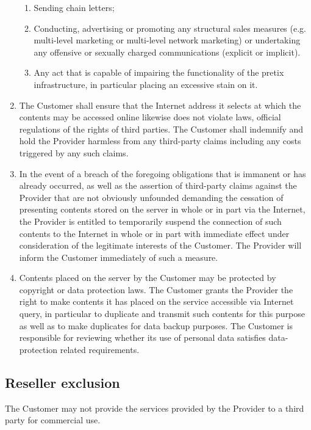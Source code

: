 \documentclass{terms}
\begin{document}
\begin{enumerate}
\begin{enumerate}
\item Sending chain letters;
\item Conducting, advertising or promoting any structural sales measures (e.g. multi-level marketing or multi-level network marketing) or undertaking any offensive or sexually charged communications (explicit or implicit).
\item Any act that is capable of impairing the functionality of the pretix infrastructure, in particular placing an excessive stain on it.
\end{enumerate}
\item The Customer shall ensure that the Internet address it selects at which the contents may be accessed online likewise does not violate laws, official regulations of the rights of third parties. The Customer shall indemnify and hold the Provider harmless from any third-party claims including any costs triggered by any such claims.
\item In the event of a breach of the foregoing obligations that is immanent or has already occurred, as well as the assertion of third-party claims against the Provider that are not obviously unfounded demanding the cessation of presenting contents stored on the server in whole or in part via the Internet, the Provider is entitled to temporarily suspend the connection of such contents to the Internet in whole or in part with immediate effect under consideration of the legitimate interests of the Customer. The Provider will inform the Customer immediately of such a measure.
\item Contents placed on the server by the Customer may be protected by copyright or data protection laws. The Customer grants the Provider the right to make contents it has placed on the service accessible via Internet query, in particular to duplicate and transmit such contents for this purpose as well as to make duplicates for data backup purposes. The Customer is responsible for reviewing whether its use of personal data satisfies data-protection related requirements.
\end{enumerate}
\subsection{Reseller exclusion}
The Customer may not provide the services provided by the Provider to a third party for commercial use.
\end{document}
